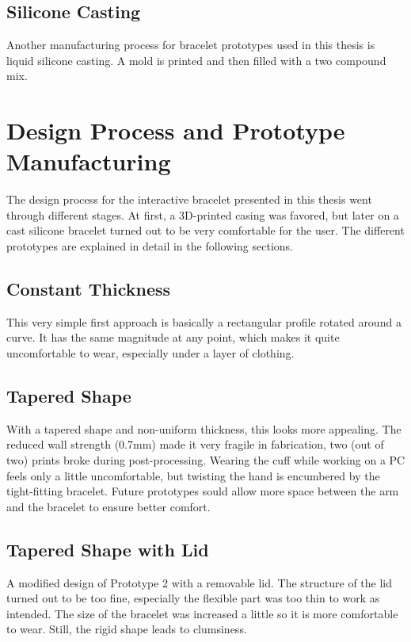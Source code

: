 \subsection{Silicone Casting}
Another manufacturing process for bracelet prototypes used in this thesis is liquid silicone casting. A mold is printed and then filled with a two compound mix.

\section{Design Process and Prototype Manufacturing}

The design process for the interactive bracelet presented in this thesis went through different stages. At first, a 3D-printed casing was favored, but later on a cast silicone bracelet turned out to be very comfortable for the user. The different prototypes are explained in detail in the following sections.

\subsection{Constant Thickness}

This very simple first approach is basically a rectangular profile rotated around a curve. It has the same magnitude at any point, which makes it quite uncomfortable to wear, especially under a layer of clothing.

\subsection{Tapered Shape}

With a tapered shape and non-uniform thickness, this looks more appealing. The reduced wall strength (0.7mm) made it very fragile in fabrication, two (out of two) prints broke during post-processing. Wearing the cuff while working on a PC feels only a little uncomfortable, but twisting the hand is encumbered by the tight-fitting bracelet. Future prototypes sould allow more space between the arm and the bracelet to ensure better comfort.

\subsection{Tapered Shape with Lid}

A modified design of Prototype 2 with a removable lid. The structure of the lid turned out to be too fine, especially the flexible part was too thin to work as intended. The size of the bracelet was increased a little so it is more comfortable to wear. Still, the rigid shape leads to clumsiness.

